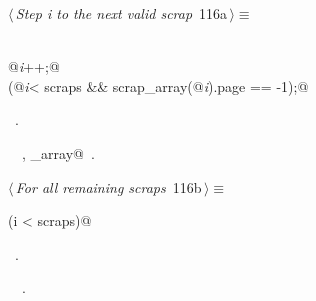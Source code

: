 \documentclass[a4paper]{report}
\begin{document}
\begin{flushleft} \small
\begin{minipage}{\linewidth}\label{scrap246}\raggedright\small
{} $\langle\,${\it Step \hbox{\slshape\sffamily i\/} to the next valid scrap}\nobreak\ {\footnotesize {116a}}$\,\rangle\equiv$
\vspace{-1ex}
\begin{list}{}{} \item
\mbox{}\verb@do@\\
\mbox{}\verb@   @\hbox{\slshape\sffamily i\/}\verb@++;@\\
\mbox{}\verb@while (@\hbox{\slshape\sffamily i\/}\verb@ < scraps && scrap_array(@\hbox{\slshape\sffamily i\/}\verb@).page == -1);@\\
\mbox{}\verb@@{\NWsep}
\end{list}
\vspace{-1.5ex}
\footnotesize
\begin{list}{}{\setlength{\itemsep}{-\parsep}\setlength{\itemindent}{-\leftmargin}}
\item \NWtxtMacroRefIn\ .
\item \NWtxtIdentsUsed\nobreak\  \verb@scraps@\nobreak\ , \verb@scrap_array@\nobreak\ .
\item{}
\end{list}
\end{minipage}\vspace{4ex}
\end{flushleft}
\begin{flushleft} \small
\begin{minipage}{\linewidth}\label{scrap247}\raggedright\small
{} $\langle\,${\it For all remaining scraps}\nobreak\ {\footnotesize {116b}}$\,\rangle\equiv$
\vspace{-1ex}
\begin{list}{}{} \item
\mbox{}\verb@while (i < scraps)@{\NWsep}
\end{list}
\vspace{-1.5ex}
\footnotesize
\begin{list}{}{\setlength{\itemsep}{-\parsep}\setlength{\itemindent}{-\leftmargin}}
\item \NWtxtMacroRefIn\ .
\item \NWtxtIdentsUsed\nobreak\  \verb@scraps@\nobreak\ .
\item{}
\end{list}
\end{minipage}\vspace{4ex}
\end{flushleft}
\end{document}
